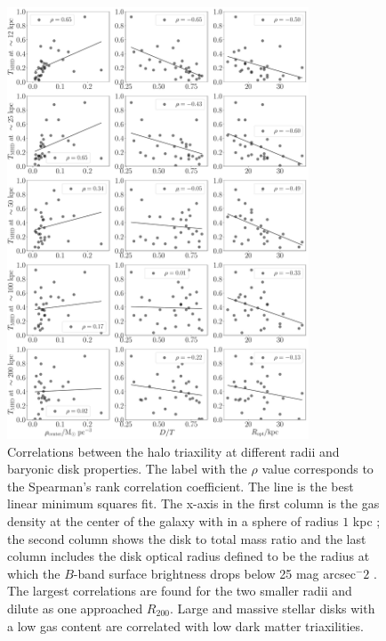 \documentclass[a4paper,fleqn,usenatbib]{mnras}
\begin{document}
\begin{figure}
\begin{center}
\includegraphics[width=0.8\textwidth]{correlation_T_MHD_disk.pdf}
\end{center}
\caption{Correlations between the halo triaxility at different radii
  and baryonic disk properties. 
  The label with the $\rho$ value corresponds to the Spearman's rank
  correlation coefficient.
  The line is the best linear minimum squares fit.
  The x-axis in the first column is the gas density at the center of
  the galaxy with in a sphere of radius  $1$ kpc \citep{Pakmor17};
  the second column shows the disk to total mass ratio and the last
  column includes the disk optical radius defined to be the radius at which the
  $B$-band surface brightness drops below 25 mag arcsec$^-2$
  \citep{auriga}.
  The largest correlations are found for the two smaller radii and
  dilute as one approached $R_{200}$.
  Large and massive stellar disks with a low gas content are
  correlated with low dark matter triaxilities.
}
\label{fig:disk_correlations}
\end{figure}
\end{document}
